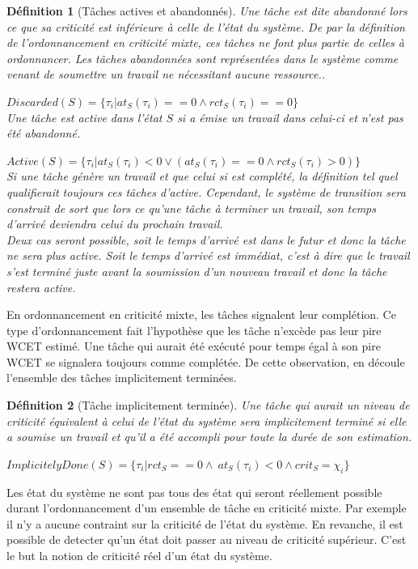 \documentclass[11pt,a4paper,oneside]{book}
\theoremstyle{break}
\newtheorem{defin}{Définition}
\theoremstyle{breakplain}
\begin{document}
\begin{defin}[Tâches actives et abandonnés]
Une tâche est dite abandonné lors ce que sa criticité est inférieure à celle de l'état du système. De par la définition de l'ordonnancement en criticité mixte, ces tâches ne font plus partie de celles à ordonnancer. Les tâches abandonnées sont représentées dans le système comme venant de soumettre un travail ne nécessitant aucune ressource..

$Discarded(S) = \{\tau_i | at_S(\tau_i) == 0 \wedge rct_S(\tau_i) == 0\}$\\

Une tâche est active dans l'état $S$ si a émise un travail dans celui-ci et n'est pas été abandonné.

$Active(S) = \{\tau_i | at_S(\tau_i) < 0\vee (at_S(\tau_i) == 0 \wedge rct_S(\tau_i) > 0)\}$\\

Si une tâche génère un travail et que celui si est complété, la définition tel quel qualifierait toujours ces tâches d'active. Cependant, le système de transition sera construit de sort que lors ce qu'une tâche à terminer un travail, son temps d'arrivé deviendra celui du prochain travail.\\
Deux cas seront possible, soit le temps d'arrivé est dans le futur et donc la tâche ne sera plus active. Soit le temps d'arrivé est immédiat, c'est à dire que le travail s'est terminé juste avant la soumission d'un nouveau travail et donc la tâche restera active.
\end{defin}

En ordonnancement en criticité mixte, les tâches signalent leur complétion. Ce type d'ordonnancement fait l'hypothèse que les tâche n'excède pas leur pire WCET estimé. Une tâche qui aurait été exécuté pour temps égal à son pire WCET se signalera toujours comme complétée. De cette observation, en découle l'ensemble des tâches implicitement terminées.

\begin{defin}[Tâche implicitement terminée]
Une tâche qui aurait un niveau de criticité équivalent à celui de l'état du système sera implicitement terminé si elle a soumise un travail et qu'il a été accompli pour toute la durée de son estimation.

$ImplicitelyDone(S) = \{\tau_i | rct_S == 0 \wedge\ at_S(\tau_i) < 0\wedge crit_S=\chi_i\}$\\
\end{defin}

Les état du système ne sont pas tous des état qui seront réellement possible durant l'ordonnancement d'un ensemble de tâche en criticité mixte. Par exemple il n'y a aucune contraint sur la criticité de l'état du système. En revanche, il est possible de detecter qu'un état doit passer au niveau de criticité supérieur. C'est le but la notion de criticité réel d'un état du système.
\end{document}
